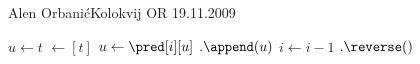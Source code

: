 \begin{naloga}{Alen Orbanić}{Kolokvij OR 19.11.2009}
\begin{odgovor}
    \begin{small}
    \begin{algorithmic}
        \State $u \gets t$
         $\gets [t]$
            \State $u \gets \pred[i][u]$
            $.\append(u)$
            \State $i \gets i - 1$
        \EndWhile
        $.\reverse()$
        \State {}
    \EndFunction
\end{algorithmic}
\end{small}

\end{odgovor}
\end{naloga}
